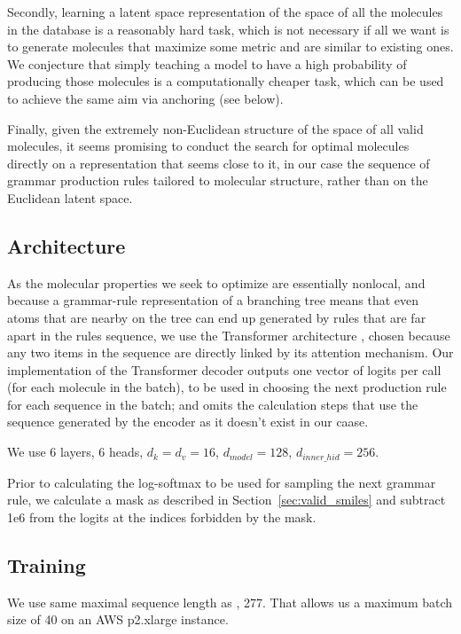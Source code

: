 \documentclass{article}
\begin{document}
Secondly, learning a latent space representation of the space of all the molecules in the database is a reasonably hard task, which is not necessary if all we want is to generate molecules that maximize some metric and are similar to existing ones. We conjecture that simply teaching a model to have a high probability of producing those molecules is a computationally cheaper task, which can be used to achieve the same aim via anchoring (see below).

Finally, given the extremely non-Euclidean structure of the space of all valid molecules, it seems promising to conduct the search for optimal molecules directly on a representation that seems close to it, in our case the sequence of grammar production rules tailored to molecular structure, rather than on the Euclidean latent space. 

\subsection{Architecture}
As the molecular properties we seek to optimize are essentially nonlocal, and because a grammar-rule representation of a branching tree means that even atoms that are nearby on the tree can end up generated by rules that are far apart in the rules sequence, we use the Transformer architecture \cite{Transformer17}, chosen because any two items in the sequence are directly linked by its attention mechanism. Our implementation of the Transformer decoder outputs one vector of logits per call (for each molecule in the batch), to be used in choosing the next production rule for each sequence in the batch; and omits the calculation steps that use the sequence generated by the encoder as it doesn't exist in our caase.

We use 6 layers, 6 heads, $d_k=d_v=16$, $d_{model}=128$, $d_{inner\_hid}=256$.

Prior to calculating the log-softmax to be used for sampling the next grammar rule, we calculate a mask as described in Section~\ref{sec:valid_smiles} and subtract 1e6 from the logits at the indices forbidden by the mask. 

\subsection{Training}\label{sec:training}
We use same maximal sequence length as \cite{kusner17}, 277.
That allows us a maximum batch size of 40 on an AWS p2.xlarge instance. 
\end{document}
